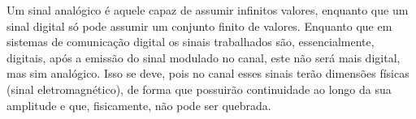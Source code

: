 Um sinal analógico é aquele capaz de assumir infinitos valores, enquanto que um sinal digital só pode assumir um conjunto finito de valores. Enquanto que em sistemas de comunicação digital os sinais trabalhados são, essencialmente, digitais, após a emissão do sinal modulado no canal, este não será mais digital, mas sim analógico. Isso se deve, pois no canal esses sinais terão dimensões físicas (sinal eletromagnético), de forma que possuirão continuidade ao longo da sua amplitude e que, fisicamente, não pode ser quebrada.
